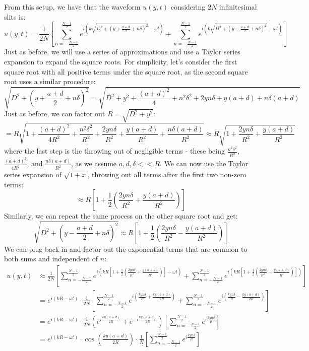 From this setup, we have that the waveform $u(y, t)$ considering $2N$ infinitesimal slits is: 
\[
	u(y, t) = \frac{1}{2N} \left[\sum_{n = -\frac{N-1}{2}}^{\frac{N-1}{2}} e^{i \left(k \sqrt{D^2 + \left(y + \frac{a+d}{2} + n\delta \right)^2} - \omega t \right)} + \sum_{n = -\frac{N-1}{2}}^{\frac{N-1}{2}} e^{i \left(k \sqrt{D^2 + \left(y - \frac{a+d}{2} + n\delta \right)^2} - \omega t \right)} \right]
\]
Just as before, we will use a series of approximations and use a Taylor series expansion to expand the square roots. For simplicity, let's consider the first square root with all positive terms under the square root, as the second square root uses a similar procedure: 
\[
	\sqrt{D^2 + \left(y + \frac{a+d}{2} + n\delta \right)^2} = \sqrt{D^2 + y^2 + \frac{(a+d)^2}{4} + n^2 \delta^2 + 2yn\delta + y(a+d) + n\delta(a+d)}
\]
Just as before, we can factor out $R = \sqrt{D^2 + y^2}$:
\[
	= R\sqrt{1 + \frac{(a+d)^2}{4R^2} + \frac{n^2 \delta^2}{R^2} + \frac{2yn\delta}{R^2} + \frac{y(a+d)}{R^2} + \frac{n\delta(a+d)}{R^2}} \approx R \sqrt{1 + \frac{2yn\delta}{R^2} + \frac{y(a+d)}{R^2}}
\]
where the last step is the throwing out of negligible terms - these being $\frac{n^2 \delta^2}{R^2}$, $\frac{(a+d)^2}{4R^2}$, and $\frac{n\delta(a+d)}{R^2}$, as we assume $a, d, \delta << R$. We can now use the Taylor series expansion of $\sqrt{1+x}$, throwing out all terms after the first two non-zero terms: 
\[
	\approx R \left[1 + \frac{1}{2} \left( \frac{2yn\delta}{R^2} + \frac{y(a+d)}{R^2} \right) \right]
\]
Similarly, we can repeat the same process on the other square root and get: 
\[
	\sqrt{D^2 + \left(y - \frac{a+d}{2} + n\delta \right)^2} \approx R \left[1 + \frac{1}{2} \left( \frac{2yn\delta}{R^2} - \frac{y(a+d)}{R^2} \right) \right]
\]
We can plug back in and factor out the exponential terms that are common to both sums and independent of $n$: 
\begin{align*}
	u(y, t) &\approx \frac{1}{2N} \left[\sum_{n = -\frac{N-1}{2}}^{\frac{N-1}{2}} e^{i \left(k R \left[1 + \frac{1}{2} \left( \frac{2yn\delta}{R^2} + \frac{y(a+d)}{R^2} \right) \right] - \omega t \right)} + \sum_{n = -\frac{N-1}{2}}^{\frac{N-1}{2}} e^{i \left(k R \left[1 + \frac{1}{2} \left( \frac{2yn\delta}{R^2} - \frac{y(a+d)}{R^2} \right) \right]\right)} \right] \\
	&= e^{i(kR-\omega t)} \cdot \frac{1}{2N} \left[\sum_{n = -\frac{N-1}{2}}^{\frac{N-1}{2}} e^{i \left( \frac{kyn\delta}{R} + \frac{ky(a+d)}{2R} \right)} + \sum_{n = -\frac{N-1}{2}}^{\frac{N-1}{2}} e^{i \left( \frac{kyn\delta}{R} - \frac{ky(a+d)}{2R} \right)} \right] \\
	&= e^{i(kR-\omega t)} \cdot \frac{1}{2N}  \left( e^{i \frac{ky(a+d)}{2R}} + e^{-i \frac{ky(a+d)}{2R}} \right) \left[\sum_{n = -\frac{N-1}{2}}^{\frac{N-1}{2}} e^{i \frac{kyn\delta}{R}} \right] \\
	&= e^{i(kR-\omega t)} \cdot \cos\left( \frac{ky(a+d)}{2R} \right) \cdot \frac{1}{N} \left[\sum_{n = -\frac{N-1}{2}}^{\frac{N-1}{2}} e^{i \frac{kyn\delta}{R}} \right] 
\end{align*}
